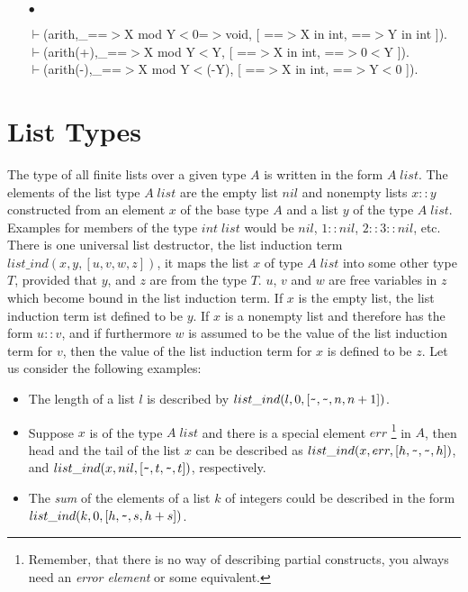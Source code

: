 \documentclass[11pt]{report}
\newcommand{\inv}[1]{\index{#1}}
\begin{document}
\begin{enumerate}
  
 \item[$\bullet$]
\begin{sf}\begin{tabbing}
$\vdash$(arith,\_\hspace{0.1em}==$>$X mod Y$<$0=$>$void, [ ==$>$X in int, ==$>$Y in int ]).\\[-0.15ex]
$\vdash$(arith(+),\_\hspace{0.1em}==$>$X mod Y$<$Y, [ ==$>$X in int, ==$>$0$<$Y ]).\\[-0.15ex]
$\vdash$(arith(-),\_\hspace{0.1em}==$>$X mod Y$<$(-Y), [ ==$>$X in int, ==$>$Y$<$0 ]).
\end{tabbing}\end{sf}

  
 \end{enumerate}
 \pagebreak
  
 \section{List Types}
 \inv{list type}
 The type of all finite lists over a given type $A$ is written in
 the form $A\;list$. The elements of the list type $A\;list$ are the 
 empty list $nil$ and nonempty lists $x$$::$$y$ constructed from an
 element $x$ of the base type $A$ and a list $y$ of the type $A\;list$.
 Examples for members of the type $int\; list$ would be
 $nil$, $1$$::$$nil$, $2$$::$$3$$::$$nil$, etc.
 There is one universal list destructor, the list induction term
 $list\_ind(x,y,[u,v,w,z])$, it maps the list $x$ of type $A\; list$
 into some other type $T$, provided that $y$, and $z$ are from the 
 type $T$. $u$, $v$ and $w$ are free variables in $z$ which 
 become bound in the list induction term. If $x$ is the empty list,
 the list induction term ist defined to be $y$. If $x$ is a nonempty
 list and therefore has the form $u::v$, and if furthermore $w$
 is assumed to be the value of the list induction term for $v$,
 then the value of the list induction term for $x$ is defined to
 be $z$. Let us consider the following examples:
 \begin{itemize}
 \item
 The length of a list $l$ is described by
 $list\_ind(l,0,[\verb'~',\verb'~',n,n+1])$.
 \item
 Suppose $x$ is of the type $A\; list$ and there is a special
 element $err$ \footnote{Remember, that there is no way of describing
 partial constructs, you always need an \emph{error element} or
 some equivalent.}
 in $A$, then head and the tail of the list $x$ can
 be described as $list\_ind(x,err,[h,\verb'~',\verb'~',h])$, and
 $list\_ind(x,nil,[\verb'~',t,\verb'~',t])$, respectively.
 \item
 The \emph{sum} of the elements of a list $k$ of integers could be
 described in the form $list\_ind(k,0,[h,\verb'~',s,h+s])$.
 \end{itemize}
\end{document}
